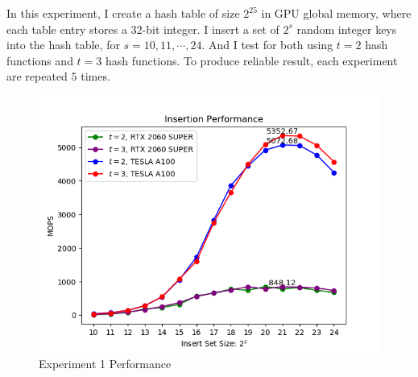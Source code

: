 \documentclass[10pt,twocolumn,letterpaper]{article}
\begin{document}
In this experiment, I create a hash table of size $2^{25}$ in GPU global memory, where each table entry stores a 32-bit integer. I insert a set of $2^s$ random integer keys into the hash table, for $s = 10, 11, \cdots, 24$. And I test for both using $t = 2$ hash functions and $t = 3$ hash functions. To produce reliable result, each experiment are repeated $5$ times.

\begin{figure}[h]
    \centering
    \includegraphics[scale=0.5]{figures/1.png}
    \caption{Experiment 1 Performance}
    \label{fig:experiment1}
\end{figure}
\end{document}
